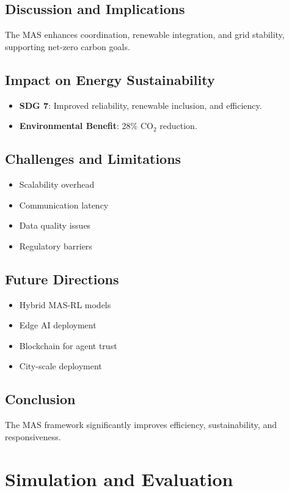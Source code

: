 \documentclass[12pt, a4paper, oneside]{book}
\begin{document}
\section{Discussion and Implications}
The MAS enhances coordination, renewable integration, and grid stability, supporting net-zero carbon goals.

\section{Impact on Energy Sustainability}
\begin{itemize}
    \item \textbf{SDG 7}: Improved reliability, renewable inclusion, and efficiency.
    \item \textbf{Environmental Benefit}: 28\% CO$_2$ reduction.
\end{itemize}

\section{Challenges and Limitations}
\begin{itemize}
    \item Scalability overhead
    \item Communication latency
    \item Data quality issues
    \item Regulatory barriers
\end{itemize}

\section{Future Directions}
\begin{itemize}
    \item Hybrid MAS-RL models
    \item Edge AI deployment
    \item Blockchain for agent trust
    \item City-scale deployment
\end{itemize}

\section{Conclusion}
The MAS framework significantly improves efficiency, sustainability, and responsiveness.

\chapter{Simulation and Evaluation}
\end{document}
